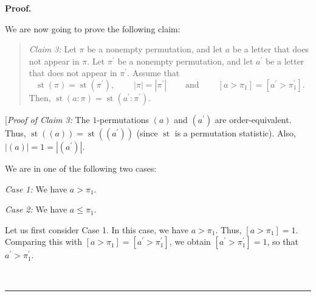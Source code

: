 \documentclass[numbers=enddot,12pt,final,onecolumn,notitlepage]{scrartcl}%
\theoremstyle{definition}
\newenvironment{statement}{\begin{quote}}{\end{quote}}
\newenvironment{proof}[1][Proof]{\noindent\textbf{#1.} }{\ \rule{0.5em}{0.5em}}
\begin{document}
\begin{proof}
\begin{statement}
\end{statement}

We are now going to prove the following claim:

\begin{statement}
\textit{Claim 3:} Let $\pi$ be a nonempty permutation, and let $a$ be a letter
that does not appear in $\pi$. Let $\pi^{\prime}$ be a nonempty permutation,
and let $a^{\prime}$ be a letter that does not appear in $\pi^{\prime}$.
Assume that%
\[
\operatorname*{st}\left(  \pi\right)  =\operatorname*{st}\left(  \pi^{\prime
}\right)  ,\ \ \ \ \ \ \ \ \ \ \left\vert \pi\right\vert =\left\vert
\pi^{\prime}\right\vert \ \ \ \ \ \ \ \ \ \ \text{and}%
\ \ \ \ \ \ \ \ \ \ \left[  a>\pi_{1}\right]  =\left[  a^{\prime}>\pi
_{1}^{\prime}\right]  .
\]
Then, $\operatorname*{st}\left(  a:\pi\right)  =\operatorname*{st}\left(
a^{\prime}:\pi^{\prime}\right)  $.
\end{statement}

[\textit{Proof of Claim 3:} The $1$-permutations $\left(  a\right)  $ and
$\left(  a^{\prime}\right)  $ are order-equivalent. Thus, $\operatorname*{st}%
\left(  \left(  a\right)  \right)  =\operatorname*{st}\left(  \left(
a^{\prime}\right)  \right)  $ (since $\operatorname*{st}$ is a permutation
statistic). Also, $\left\vert \left(  a\right)  \right\vert =1=\left\vert
\left(  a^{\prime}\right)  \right\vert $.

We are in one of the following two cases:

\textit{Case 1:} We have $a>\pi_{1}$.

\textit{Case 2:} We have $a\leq\pi_{1}$.

Let us first consider Case 1. In this case, we have $a>\pi_{1}$. Thus,
$\left[  a>\pi_{1}\right]  =1$. Comparing this with $\left[  a>\pi_{1}\right]
=\left[  a^{\prime}>\pi_{1}^{\prime}\right]  $, we obtain $\left[  a^{\prime
}>\pi_{1}^{\prime}\right]  =1$, so that $a^{\prime}>\pi_{1}^{\prime}$.


\end{proof}
\end{document}
